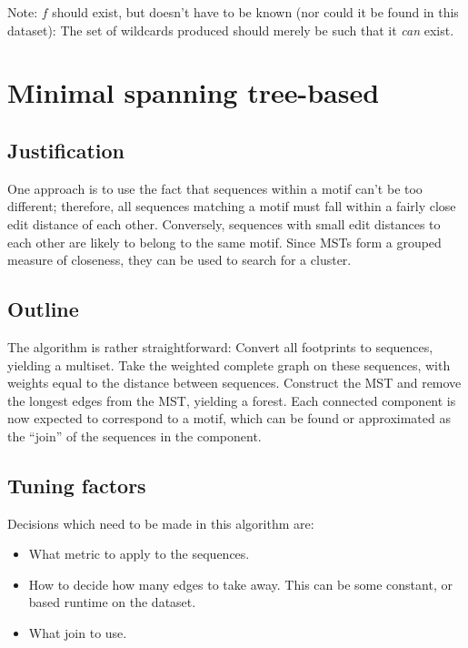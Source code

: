 \documentclass[fleqn]{book}
\providecommand{\tightlist}{%
  \setlength{\itemsep}{0pt}\setlength{\parskip}{0pt}}
\begin{document}
Note: \(f\) should exist, but doesn't have to be known (nor could it be
found in this dataset): The set of wildcards produced should merely be
such that it \emph{can} exist.

\section{Minimal spanning tree-based}\label{minimal-spanning-tree-based}

\subsection{Justification}\label{justification}

One approach is to use the fact that sequences within a motif can't be
too different; therefore, all sequences matching a motif must fall
within a fairly close edit distance of each other. Conversely, sequences
with small edit distances to each other are likely to belong to the same
motif. Since MSTs form a grouped measure of closeness, they can be used
to search for a cluster.

\subsection{Outline}\label{outline}

The algorithm is rather straightforward: Convert all footprints to
sequences, yielding a multiset. Take the weighted complete graph on
these sequences, with weights equal to the distance between sequences.
Construct the MST and remove the longest edges from the MST, yielding a
forest. Each connected component is now expected to correspond to a
motif, which can be found or approximated as the ``join'' of the
sequences in the component.

\subsection{Tuning factors}\label{tuning-factors}

Decisions which need to be made in this algorithm are:

\begin{itemize}
\tightlist
\item
  What metric to apply to the sequences.
\item
  How to decide how many edges to take away. This can be some constant,
  or based runtime on the dataset.
\item
  What join to use.
\end{itemize}
\end{document}

